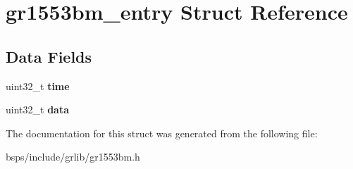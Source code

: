 \hypertarget{structgr1553bm__entry}{}\section{gr1553bm\+\_\+entry Struct Reference}
\label{structgr1553bm__entry}
\subsection*{Data Fields}
\begin{DoxyCompactItemize}
\item 
\mbox{\label{structgr1553bm__entry_a6edf2a44f1dfdc460d94f64deed62bf9}} 
uint32\+\_\+t {\bfseries time}
\item 
\mbox{\label{structgr1553bm__entry_ae7f16b2260a4ad556739e4a51f0a0d4a}} 
uint32\+\_\+t {\bfseries data}
\end{DoxyCompactItemize}


The documentation for this struct was generated from the following file\+:\begin{DoxyCompactItemize}
\item 
bsps/include/grlib/gr1553bm.\+h\end{DoxyCompactItemize}
